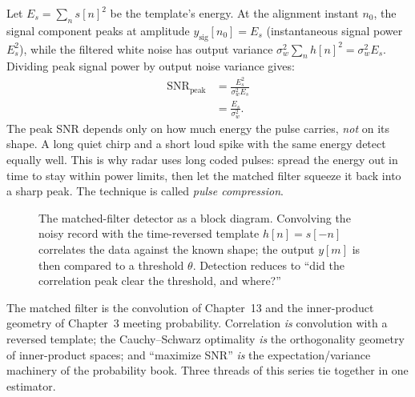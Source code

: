 \begin{happeningbox}
Let $E_s = \sum_n s[n]^2$ be the template's energy. At the alignment instant $n_0$, the signal component peaks at amplitude $y_{\text{sig}}[n_0] = E_s$ (instantaneous signal power $E_s^2$), while the filtered white noise has output variance $\sigma_w^2\sum_n h[n]^2 = \sigma_w^2 E_s$. Dividing peak signal power by output noise variance gives:
\begin{align*}
  \mathrm{SNR}_{\text{peak}} &= \frac{E_s^2}{\sigma_w^2 E_s} \\
  &= \frac{E_s}{\sigma_w^2}.
\end{align*}
The peak SNR depends only on how much energy the pulse carries, \emph{not} on its shape.
A long quiet chirp and a short loud spike with the same energy detect equally
well. This is why radar uses long coded pulses: spread the energy out
in time to stay within power limits, then let the matched filter squeeze it back
into a sharp peak. The technique is called \emph{pulse compression}.
\end{happeningbox}

\begin{figure}[H]
\centering
{}
\caption{The matched-filter detector as a block diagram. Convolving the noisy
record with the time-reversed template $h[n]=s[-n]$ correlates the data against
the known shape; the output $y[m]$ is then compared to a threshold $\theta$.
Detection reduces to ``did the correlation peak clear the threshold, and where?''}
\label{ch20:fig-matched-block}
\end{figure}

\begin{connectionbox}
The matched filter is the convolution of Chapter~13 and the inner-product
geometry of Chapter~3 meeting probability. Correlation \emph{is} convolution with
a reversed template; the Cauchy--Schwarz optimality \emph{is} the orthogonality
geometry of inner-product spaces; and ``maximize SNR'' \emph{is} the
expectation/variance machinery of the probability book. Three threads of this
series tie together in one estimator.
\end{connectionbox}

